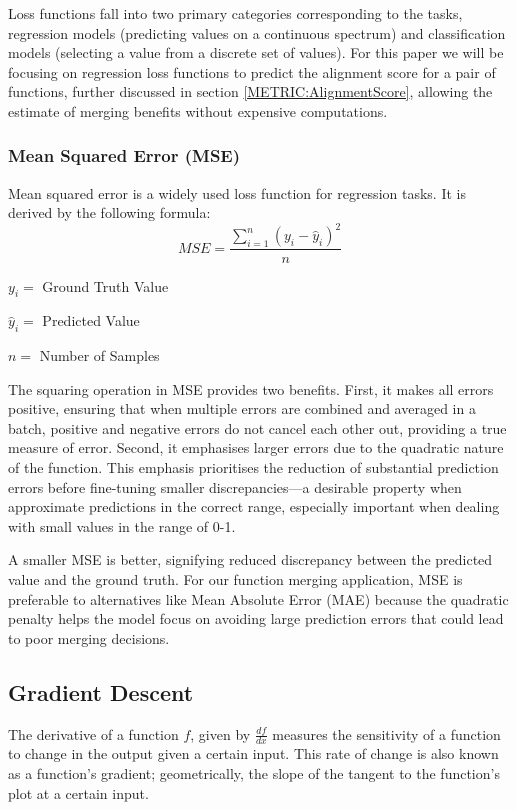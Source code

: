 Loss functions fall into two primary categories corresponding to the tasks, regression models (predicting values on a continuous spectrum) and classification models (selecting a value from a discrete set of values). For this paper we will be focusing on regression loss functions to predict the alignment score for a pair of functions, further discussed in section  \ref{METRIC:AlignmentScore}, allowing the estimate of merging benefits without expensive computations.

\subsubsection{Mean Squared Error (MSE)}
Mean squared error is a widely used loss function for regression tasks. It is derived by the following formula: 
$$MSE=\frac{\sum^n_{i=1}(y_i-\hat{y}_i)^2}{n}$$

\hspace{1cm} $y_i = $ Ground Truth Value

\hspace{1cm} $\hat{y}_i = $ Predicted Value

\hspace{1cm} $n = $ Number of Samples

The squaring operation in MSE provides two benefits. First, it makes all errors positive, ensuring that when multiple errors are combined and averaged in a batch, positive and negative errors do not cancel each other out, providing a true measure of error. Second, it emphasises larger errors due to the quadratic nature of the function. This emphasis prioritises the reduction of substantial prediction errors before fine-tuning smaller discrepancies—a desirable property when approximate predictions in the correct range, especially important when dealing with small values in the range of 0-1.

A smaller MSE is better, signifying reduced discrepancy between the predicted value and the ground truth. For our function merging application, MSE is preferable to alternatives like Mean Absolute Error (MAE) because the quadratic penalty helps the model focus on avoiding large prediction errors that could lead to poor merging decisions.


\subsection{Gradient Descent} \label{ML:Gradients}
The derivative of a function $f$, given by $\frac{df}{dx}$ measures the sensitivity of a function to change in the output given a certain input. This rate of change is also known as a function's gradient; geometrically, the slope of the tangent to the function's plot at a certain input. 

